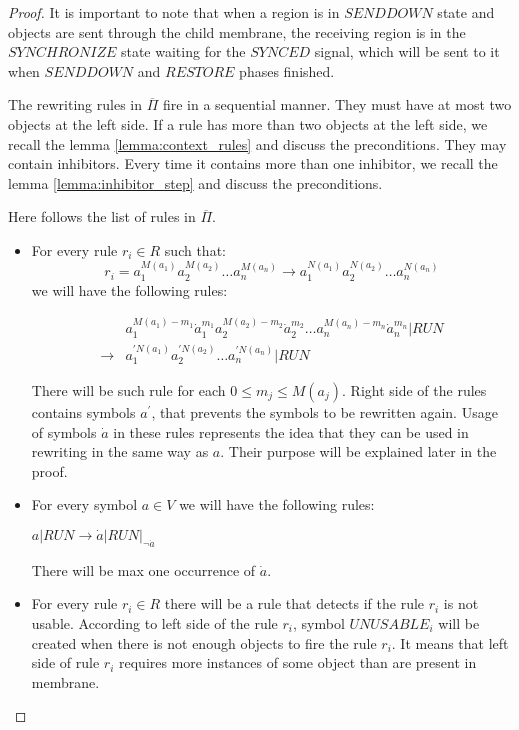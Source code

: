 \begin{proof}
  It is important to note that when a region is in $SENDDOWN$ state and objects are sent through the child membrane, the receiving region is in the $SYNCHRONIZE$ state waiting for the $SYNCED$ signal, which will be sent to it when $SENDDOWN$ and $RESTORE$ phases finished.
  


  The rewriting rules in $\overline{\Pi}$ fire in a sequential manner.
  They must have at most two objects at the left side. If a rule has more than two objects at the left side, we recall the lemma \ref{lemma:context_rules} and discuss the preconditions.
  They may contain inhibitors. Every time it contains more than one inhibitor, we recall the lemma \ref{lemma:inhibitor_step} and discuss the preconditions. 

  Here follows the list of rules in $\overline{\Pi}$.

  \begin{itemize}
    \item For every rule $r_i\in R$ such that:
      $$r_i = a_1^{M(a_1)}a_2^{M(a_2)}\dots a_n^{M(a_n)} \rightarrow a_1^{N(a_1)}a_2^{N(a_2)}\dots a_n^{N(a_n)}$$ we will have the following rules:
  
      \begin{align*}
        & a_1^{M(a_1)-m_1}\dot{a}_1^{m_1}a_2^{M(a_2)-m_2}\dot{a}_2^{m_2}\dots a_n^{M(a_n)-m_n}\dot{a}_n^{m_n}|RUN \\
        \rightarrow& a_1^{\prime N(a_1)}a_2^{\prime N(a_2)}\dots a_n^{\prime N(a_n)}|RUN
      \end{align*}

    There will be such rule for each $0\leq m_j\leq M(a_j)$.
    Right side of the rules contains symbols $a^\prime$, that prevents the symbols to be rewritten again.
    Usage of symbols $\dot{a}$ in these rules represents the idea that they can be used in rewriting in the same way as $a$. Their purpose will be explained later in the proof.

    \item For every symbol $a\in V$ we will have the following rules:

    $a|RUN \rightarrow \dot{a}|RUN|_{\neg \dot{a}}$

    There will be max one occurrence of $\dot{a}$.

    \item For every rule $r_i\in R$ there will be a rule that detects if the rule $r_i$ is not usable. According to left side of the rule $r_i$, symbol $UNUSABLE_i$ will be created when there is not enough objects to fire the rule $r_i$. It means that left side of rule $r_i$ requires more instances of some object than are present in membrane.


\end{itemize}
\end{proof}
